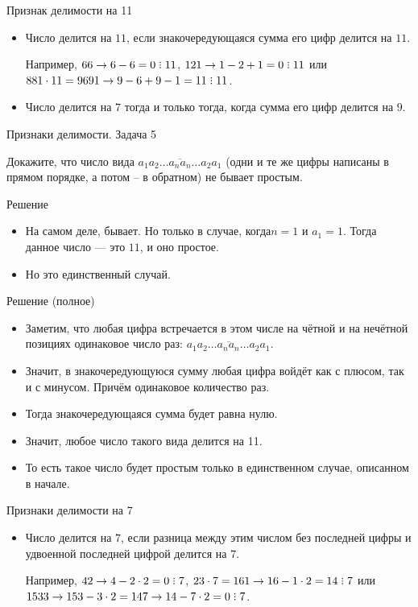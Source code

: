 \documentclass[17pt]{extarticle}
\newcommand{\divsby}{\mathrel{\rlap{.}\rlap{\raisebox{0.55ex}{.}}\raisebox{1.1ex}{.}}}
\newcommand{\newslide}[1]{\newpage \begin{center} \large #1 \end{center}}
\newcommand{\lb}{\linebreak}
\begin{document}
\newslide{Признак делимости на 11}

\begin{itemize}
\item Число делится на $11$, если знакочередующаяся сумма его цифр делится на $11$.

Например, $66 \to 6-6=0 \divsby 11$, $121 \to 1-2+1=0 \divsby 11$ \lb или $881\cdot11=9691\to 9-6+9-1=11\divsby11$.
\item Число делится на $7$ тогда и только тогда, когда сумма его цифр делится на $9$.
\end{itemize}

\newslide{Признаки делимости. Задача 5}

Докажите, что число вида $\overline{a_1a_2\ldots a_na_n\ldots a_2a_1}$ (одни и те же цифры написаны в прямом порядке, а потом -- в обратном) не бывает простым.

\newslide{Решение}\vspace{-10mm}

\begin{itemize}\itemsep=-1mm
\item На самом деле, бывает. Но только в случае, когда\lb $n=1$ и $a_1=1$. Тогда данное число --- это $11$, и оно простое.
\item Но это единственный случай. 
\end{itemize}

\newslide{Решение (полное)}\vspace{-12mm}

\begin{itemize}\itemsep=-3mm
\item Заметим, что любая цифра встречается в этом числе на чётной и на нечётной позициях одинаковое число раз: $\overline{a_1a_2\ldots a_na_n\ldots a_2a_1}$.
\item Значит, в знакочередующуюся сумму любая цифра войдёт как с плюсом, так и с минусом. Причём одинаковое количество раз.
\item Тогда знакочередующаяся сумма будет равна нулю.
\item Значит, любое число такого вида делится на 11. 
\item То есть такое число будет простым только в единственном случае, описанном в начале.
\end{itemize}

\newslide{Признаки делимости на 7}

\begin{itemize}
\item Число делится на $7$, если разница между этим числом без последней цифры и удвоенной последней цифрой делится на $7$.

Например, $42 \to 4-2\cdot2=0 \divsby 7$, $23\cdot7=161 \to 16-1\cdot2=14 \divsby 7$ или $1533 \to 153-3\cdot2 = 147 \to 14 - 7\cdot2 = 0 \divsby 7$.
\end{itemize}
\end{document}
